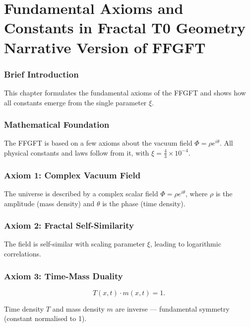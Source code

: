 \chapter{Fundamental Axioms and Constants in Fractal T0 Geometry  Narrative Version of FFGFT}


	
	\subsection*{Brief Introduction}
	
	This chapter formulates the fundamental axioms of the FFGFT and shows how all constants emerge from the single parameter \(\xi\).
	
	\subsection*{Mathematical Foundation}
	
	The FFGFT is based on a few axioms about the vacuum field \(\Phi = \rho e^{i\theta}\). All physical constants and laws follow from it, with \(\xi = \frac{4}{3} \times 10^{-4}\).
	
	\subsection*{Axiom 1: Complex Vacuum Field}
	
	The universe is described by a complex scalar field \(\Phi = \rho e^{i\theta}\), where \(\rho\) is the amplitude (mass density) and \(\theta\) is the phase (time density).
	
	\subsection*{Axiom 2: Fractal Self-Similarity}
	
	The field is self-similar with scaling parameter \(\xi\), leading to logarithmic correlations.
	
	\subsection*{Axiom 3: Time-Mass Duality}
	
	\begin{equation}
		T(x,t) \cdot m(x,t) = 1.
	\end{equation}
	
	Time density \(T\) and mass density \(m\) are inverse — fundamental symmetry (constant normalised to 1).
	
